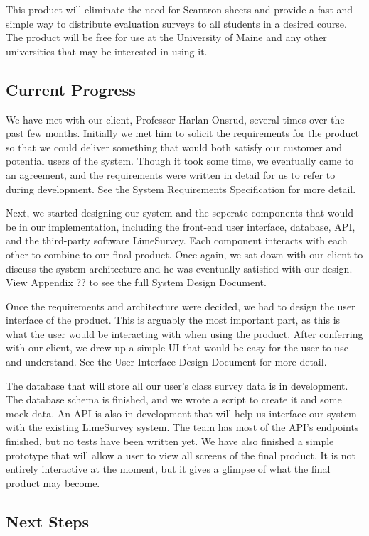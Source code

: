 \documentclass{article}
\begin{document}
This product will eliminate the need for Scantron sheets and provide a fast and simple way to distribute evaluation surveys to all students in a desired course. The product will be free for use at the University of Maine and any other universities that may be interested in using it. 
\subsection{Current Progress}

We have met with our client, Professor Harlan Onsrud, several times over the past few months. Initially we met him to solicit the requirements for the product so that we could deliver something that would both satisfy our customer and potential users of the system. Though it took some time, we eventually came to an agreement, and the requirements were written in detail for us to refer to during development. See the System Requirements Specification for more detail.
	
Next, we started designing our system and the seperate components that would be in our implementation, including the front-end user interface, database, API, and the third-party software LimeSurvey. Each component interacts with each other to combine to our final product. Once again, we sat down with our client to discuss the system architecture and he was eventually satisfied with our design. View Appendix ?? to see the full System Design Document.

Once the requirements and architecture were decided, we had to design the user interface of the product. This is arguably the most important part, as this is what the user would be interacting with when using the product. After conferring with our client, we drew up a simple UI that would be easy for the user to use and understand. See the User Interface Design Document for more detail.

The database that will store all our user's class survey data is in development. The database schema is finished, and we wrote a script to create it and some mock data. An API is also in development that will help us interface our system with the existing LimeSurvey system. The team has most of the API's endpoints finished, but no tests have been written yet. We have also finished a simple prototype that will allow a user to view all screens of the final product. It is not entirely interactive at the moment, but it gives a glimpse of what the final product may become.

\subsection{Next Steps}
\end{document}
